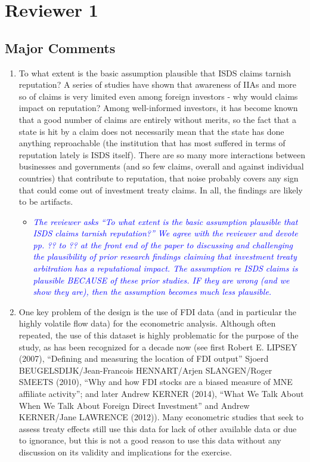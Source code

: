 \section{Reviewer 1}

\subsection{Major Comments}

\begin{enumerate}
	\item To what extent is the basic assumption plausible that ISDS claims tarnish reputation? A series of studies have shown that awareness of IIAs and more so of claims is very limited even among foreign investors - why would claims impact on reputation? Among well-informed investors, it has become known that a good number of claims are entirely without merits, so the fact that a state is hit by a claim does not necessarily mean that the state has done anything reproachable (the institution that has most suffered in terms of reputation lately is ISDS itself). There are so many more interactions between businesses and governments (and so few claims, overall and against individual countries) that contribute to reputation, that noise probably covers any sign that could come out of investment treaty claims. In all, the findings are likely to be artifacts. 
	\begin{itemize}
		\item \textcolor{blue}{ \emph{
		The reviewer asks ``To what extent is the basic assumption plausible that ISDS claims tarnish reputation?'' We agree with the reviewer and devote pp. ?? to ?? at the front end of the paper to discussing and challenging the plausibility of prior research findings claiming that investment treaty arbitration has a reputational impact. The assumption re ISDS claims is plausible BECAUSE of these prior studies. IF they are wrong (and we show they are), then the assumption becomes much less plausible.
		}}
	\end{itemize}
	\item One key problem of the design is the use of FDI data (and in particular the highly volatile flow data) for the econometric analysis. Although often repeated, the use of this dataset is highly problematic for the purpose of the study, as has been recognized for a decade now (see first Robert E. LIPSEY (2007), ``Defining and measuring the location of FDI output'' Sjoerd BEUGELSDIJK/Jean-Francois HENNART/Arjen SLANGEN/Roger SMEETS (2010), ``Why and how FDI stocks are a biased measure of MNE affiliate activity''; and later Andrew KERNER (2014), ``What We Talk About When We Talk About Foreign Direct Investment'' and Andrew KERNER/Jane LAWRENCE (2012)). Many econometric studies that seek to assess treaty effects still use this data for lack of other available data or due to ignorance, but this is not a good reason to use this data without any discussion on its validity and implications for the exercise. 

\end{enumerate}
